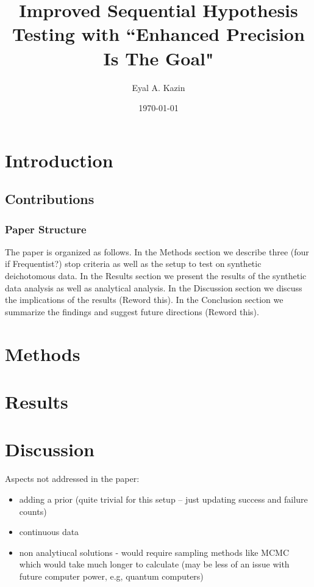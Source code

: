 \documentclass{article}
\title{Improved Sequential Hypothesis Testing with
``Enhanced Precision Is The Goal"}
\date{\today}
\author{Eyal A. Kazin}
\begin{document}
\maketitle



\section{Introduction}


\subsection{Contributions}

\subsubsection{Paper Structure}
The paper is organized as follows.
In the Methods section we describe three (four if Frequentist?)
stop criteria as well as the setup to test on synthetic deichotomous data.
In the Results section we present the results of the synthetic data analysis as well as analytical analysis.
In the Discussion section we discuss the implications of the results (Reword this).
In the Conclusion section we summarize the findings and suggest future directions (Reword this).


\section{Methods}



\section{Results}



\section{Discussion}

Aspects not addressed in the paper:

\begin{itemize}
  \item adding a prior (quite trivial for this setup -- just updating success and failure counts)
  \item continuous data
  \item non analytiucal solutions - would require sampling methods like MCMC which would take much longer to calculate (may be less of an issue with future computer power, e.g, quantum computers)
\end{itemize}
\end{document}
